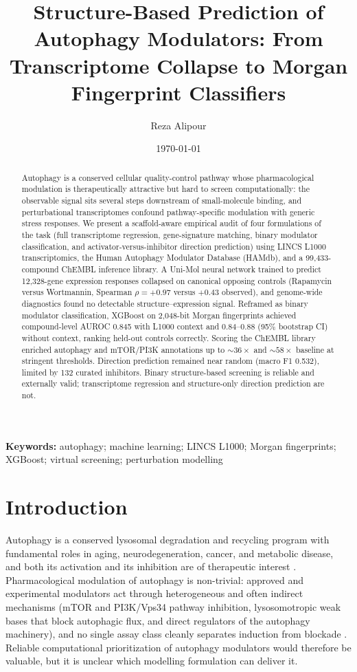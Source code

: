 \documentclass[11pt]{article}
\title{Structure-Based Prediction of Autophagy Modulators: From Transcriptome
Collapse to Morgan Fingerprint Classifiers}
\author{Reza Alipour}
\date{\today}
\newcommand{\rpm}{\ensuremath{\rho}}
\begin{document}
\maketitle

\begin{abstract}
\noindent
Autophagy is a conserved cellular quality-control pathway whose
pharmacological modulation is therapeutically attractive but hard to screen
computationally: the observable signal sits several steps downstream of
small-molecule binding, and perturbational transcriptomes confound
pathway-specific modulation with generic stress responses. We present a
scaffold-aware empirical audit of four formulations of the task (full
transcriptome regression, gene-signature matching, binary modulator
classification, and activator-versus-inhibitor direction prediction) using
LINCS L1000 transcriptomics, the Human Autophagy Modulator Database (HAMdb),
and a 99{,}433-compound ChEMBL inference library. A Uni-Mol neural network
trained to predict 12{,}328-gene expression responses collapsed on canonical
opposing controls (Rapamycin versus Wortmannin, Spearman $\rpm=+0.97$ versus
$+0.43$ observed), and genome-wide diagnostics found no detectable
structure--expression signal. Reframed as binary modulator classification,
XGBoost on 2{,}048-bit Morgan fingerprints achieved compound-level AUROC
0.845 with L1000 context and 0.84--0.88 (95\% bootstrap CI) without context,
ranking held-out controls correctly. Scoring the ChEMBL
library enriched autophagy and mTOR/PI3K annotations up to ${\sim}36\times$
and ${\sim}58\times$ baseline at stringent thresholds. Direction prediction
remained near random (macro F1 0.532), limited by 132 curated inhibitors.
Binary structure-based screening is reliable and externally valid; transcriptome
regression and structure-only direction prediction are not.
\end{abstract}

\noindent\textbf{Keywords:} autophagy; machine learning; LINCS L1000; Morgan
fingerprints; XGBoost; virtual screening; perturbation modelling

\section*{Introduction}

Autophagy is a conserved lysosomal degradation and recycling program with
fundamental roles in aging, neurodegeneration, cancer, and metabolic disease,
and both its activation and its inhibition are of therapeutic interest
\cite{levine2019,klionsky2021}. Pharmacological modulation of autophagy is
non-trivial: approved and experimental modulators act through heterogeneous
and often indirect mechanisms (mTOR and PI3K/Vps34 pathway inhibition,
lysosomotropic weak bases that block autophagic flux, and direct regulators
of the autophagy machinery), and no single assay class cleanly separates
induction from blockade \cite{galluzzi2017,klionsky2021guidelines}. Reliable
computational prioritization of autophagy modulators would therefore be
valuable, but it is unclear which modelling formulation can deliver it.
\end{document}
